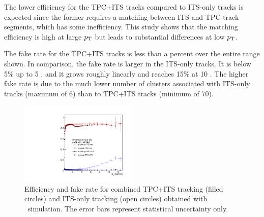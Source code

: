 The lower efficiency for the TPC+ITS tracks compared to ITS-only tracks is expected since the former requires a matching between ITS and TPC track segments, which has some inefficiency. This study shows that the matching efficiency is high at large $p_{\mathrm{T}}$ but leads to substantial differences at low $p_{\mathrm{T}}$.  


The fake rate for the TPC+ITS tracks is less than a percent over the entire range shown. In comparison, the fake rate is larger in the ITS-only tracks. It is below 5\% up to 5 \GeVc, and it grows roughly linearly and reaches 15\%  at 10 \GeVc. The higher fake rate is due to the much lower number of clusters associated with ITS-only tracks (maximum of 6) than to TPC+ITS tracks (minimum of 70).
\begin{figure}[h]
\center
\includegraphics[width=0.5\textwidth]{Tracking/HybridAndITS_Eff_fakerate_pPb_lowpt.pdf}
\caption{Efficiency and fake rate for combined TPC+ITS tracking (filled circles) and ITS-only tracking (open circles) obtained with \pPb~simulation. The error bars represent statistical uncertainty only.}
\label{fig:tpcEff}
\end{figure}



